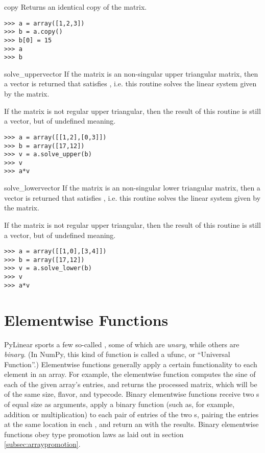 \begin{methoddesc}{copy}{}
  Returns an identical copy of the matrix.
\begin{verbatim}
>>> a = array([1,2,3])
>>> b = a.copy()
>>> b[0] = 15
>>> a
>>> b
\end{verbatim}
\end{methoddesc}
\begin{methoddesc}{solve_upper}{vector}
  If the matrix is an non-singular upper triangular matrix, then a vector
   is returned that satisfies , i.e.
  this routine solves the linear system given by the matrix.

  If the matrix is not regular upper triangular, then the result of this routine
  is still a vector, but of undefined meaning.
\begin{verbatim}
>>> a = array([[1,2],[0,3]])
>>> b = array([17,12])
>>> v = a.solve_upper(b)
>>> v
>>> a*v
\end{verbatim}
\end{methoddesc}
\begin{methoddesc}{solve_lower}{vector}
  If the matrix is an non-singular lower triangular matrix, then a vector
   is returned that satisfies , i.e.
  this routine solves the linear system given by the matrix.

  If the matrix is not regular upper triangular, then the result of this routine
  is still a vector, but of undefined meaning.
  
\begin{verbatim}
>>> a = array([[1,0],[3,4]])
>>> b = array([17,12])
>>> v = a.solve_lower(b)
>>> v
>>> a*v
\end{verbatim}
\end{methoddesc}

\section{Elementwise Functions}
\label{subsec:elementwise-funcs}

PyLinear sports a few so-called ,
 some of which are
\emph{unary}, while others are \emph{binary}. (In NumPy, this kind of function
is called a ufunc, or ``Universal Function''.) Elementwise functions generally
apply a certain functionality to each element in an array. For example, the
 elementwise function computes the sine of each of the given
array's entries, and returns the processed matrix, which will be of the same
size, flavor, and typecode. Binary elementwise functions receive two
s of equal size as arguments, apply a binary function (such as,
for example, addition or multiplication) to each pair of entries of the two
s, pairing the entries at the same location in each ,
and return an  with the results. Binary elementwise functions obey
type promotion laws as laid out in section \ref{subsec:arraypromotion}.

